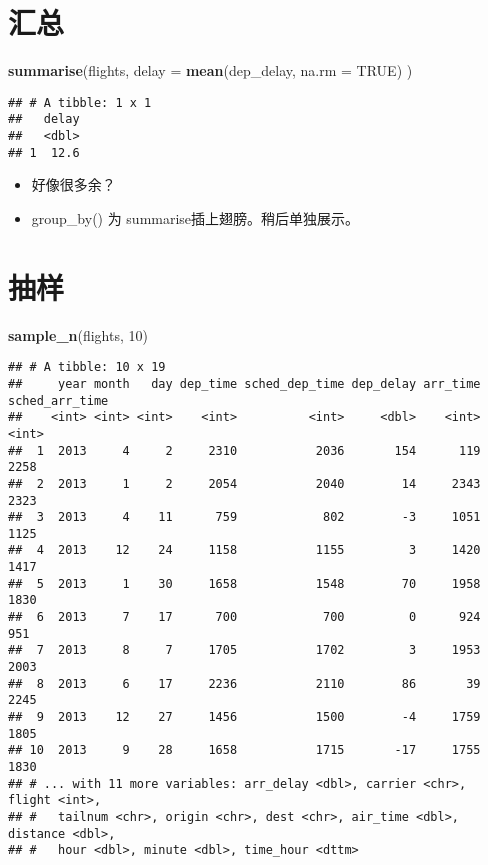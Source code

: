 \documentclass[
]{article}
\newenvironment{Shaded}{\begin{snugshade}}{\end{snugshade}}
\newcommand{\DataTypeTok}[1]{\textcolor[rgb]{0.13,0.29,0.53}{#1}}
\newcommand{\DecValTok}[1]{\textcolor[rgb]{0.00,0.00,0.81}{#1}}
\newcommand{\KeywordTok}[1]{\textcolor[rgb]{0.13,0.29,0.53}{\textbf{#1}}}
\newcommand{\NormalTok}[1]{#1}
\newcommand{\OtherTok}[1]{\textcolor[rgb]{0.56,0.35,0.01}{#1}}
\begin{document}
\hypertarget{ux6c47ux603b}{%
\section{汇总}\label{ux6c47ux603b}}

\begin{Shaded}
\begin{Highlighting}[]
\KeywordTok{summarise}\NormalTok{(flights,}
  \DataTypeTok{delay =} \KeywordTok{mean}\NormalTok{(dep_delay, }\DataTypeTok{na.rm =} \OtherTok{TRUE}\NormalTok{)}
\NormalTok{)}
\end{Highlighting}
\end{Shaded}

\begin{verbatim}
## # A tibble: 1 x 1
##   delay
##   <dbl>
## 1  12.6
\end{verbatim}

\begin{itemize}
\item
  好像很多余？
\item
  group\_by() 为 summarise插上翅膀。稍后单独展示。
\end{itemize}

\hypertarget{ux62bdux6837}{%
\section{抽样}\label{ux62bdux6837}}

\begin{Shaded}
\begin{Highlighting}[]
\KeywordTok{sample_n}\NormalTok{(flights, }\DecValTok{10}\NormalTok{)}
\end{Highlighting}
\end{Shaded}

\begin{verbatim}
## # A tibble: 10 x 19
##     year month   day dep_time sched_dep_time dep_delay arr_time sched_arr_time
##    <int> <int> <int>    <int>          <int>     <dbl>    <int>          <int>
##  1  2013     4     2     2310           2036       154      119           2258
##  2  2013     1     2     2054           2040        14     2343           2323
##  3  2013     4    11      759            802        -3     1051           1125
##  4  2013    12    24     1158           1155         3     1420           1417
##  5  2013     1    30     1658           1548        70     1958           1830
##  6  2013     7    17      700            700         0      924            951
##  7  2013     8     7     1705           1702         3     1953           2003
##  8  2013     6    17     2236           2110        86       39           2245
##  9  2013    12    27     1456           1500        -4     1759           1805
## 10  2013     9    28     1658           1715       -17     1755           1830
## # ... with 11 more variables: arr_delay <dbl>, carrier <chr>, flight <int>,
## #   tailnum <chr>, origin <chr>, dest <chr>, air_time <dbl>, distance <dbl>,
## #   hour <dbl>, minute <dbl>, time_hour <dttm>
\end{verbatim}
\end{document}
